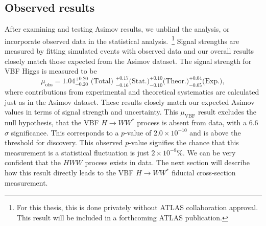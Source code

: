 \subsection{Observed results}
After examining and testing Asimov results, we unblind the analysis, or incorporate observed data in the statistical analysis.~\footnote{For this thesis, this is done privately without ATLAS collaboration approval. This result will be included in a forthcoming ATLAS publication.} Signal strengths are measured by fitting simulated events with observed data and our overall results closely match those expected from the Asimov dataset. The signal strength for VBF Higgs is measured to be
\begin{equation}
\mu_{\text{obs}} = 1.04 ^{+0.20}_{-0.20} \text{ (Total) } ^{+0.17}_{-0.16} \text{(Stat.)} ^{+0.10}_{-0.10} \text{(Theor.)} ^{+0.04}_{-0.05} \text{(Exp.)},
\end{equation}
where contributions from experimental and theoretical systematics are  calculated just as in the Asimov dataset. These results closely match our expected Asimov values in terms of signal strength and uncertainty. This $\mu_\text{VBF}$ result excludes the null hypothesis, that the VBF $H\rightarrow WW^*$ process is absent from data, with a 6.6$\sigma$ significance. This corresponds to a $p$-value of $2.0\times10^{-10}$ and is above the threshold for discovery. This observed $p$-value signifies the chance that this measurement is a statistical fluctuation is just $2 \times 10^{-8}$\%. We can be very confident that the $HWW$ process exists in data. The next section will describe how this result directly leads to the VBF $H\rightarrow WW^*$ fiducial cross-section measurement. 


